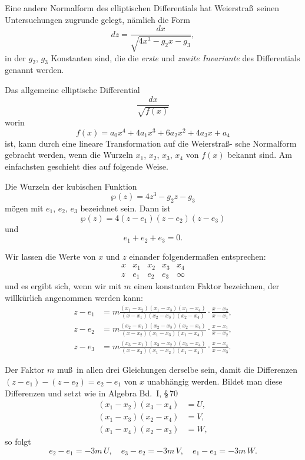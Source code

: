 \documentclass[12pt,a4paper]{book}
\theoremstyle{definition}
\begin{document}
Eine andere Normalform des elliptischen Differentials hat
Weierstra\ss\ seinen Untersuchungen zugrunde gelegt, n\"amlich
die Form
\begin{equation}
dz = \frac{dx}{\sqrt{4x^3 - g_2 x - g_3}}, \tag{1}
\end{equation}
in der $g_2$, $g_3$ Konstanten sind, die die \emph{erste} und \emph{zweite Invariante}
des Differentials genannt werden.

Das allgemeine elliptische Differential
\begin{equation}
\frac{dx}{\sqrt{f(x)}} \tag{2}
\end{equation}
worin
\begin{equation}
f(x) = a_0 x^4 + 4a_1 x^3 + 6a_2 x^2 + 4a_3 x + a_4 \tag{3}
\end{equation}
ist, kann durch eine lineare Transformation auf die Weierstra\ss-
sche Normalform gebracht werden, wenn die Wurzeln
$x_1$, $x_2$, $x_3$, $x_4$ von $f(x)$ bekannt sind. Am einfachsten geschieht
dies auf folgende Weise.

Die Wurzeln der kubischen Funktion
\[
\wp(z) = 4z^3 - g_2 z - g_3
\]
m\"ogen mit $e_1$, $e_2$, $e_3$ bezeichnet sein. Dann ist
\[
\wp(z) = 4(z - e_1)(z - e_2)(z - e_3)
\]
und
\[
e_1 + e_2 + e_3 = 0.
\]

Wir lassen die Werte von $x$ und $z$ einander folgenderma\ss en
entsprechen:
\[
\begin{array}{c|cccc}
x & x_1 & x_2 & x_3 & x_4 \\ \hline
z & e_1 & e_2 & e_3 & \infty
\end{array}
\]
und es ergibt sich, wenn wir mit $m$ einen konstanten Faktor
bezeichnen, der willk\"urlich angenommen werden kann:
\begin{equation}
\begin{aligned}
z - e_1 &= m\frac{(x_1 - x_2)(x_1 - x_3)(x_1 - x_4)}{(x - x_1)(x_2 - x_3)(x_2 - x_4)} \cdot \frac{x - x_2}{x - x_1},\\
z - e_2 &= m\frac{(x_2 - x_1)(x_2 - x_3)(x_2 - x_4)}{(x - x_2)(x_1 - x_3)(x_1 - x_4)} \cdot \frac{x - x_1}{x - x_2},\\
z - e_3 &= m\frac{(x_3 - x_1)(x_3 - x_2)(x_3 - x_4)}{(x - x_3)(x_1 - x_2)(x_1 - x_4)} \cdot \frac{x - x_4}{x - x_3}.
\end{aligned}
\tag{4}
\end{equation}

Der Faktor $m$ mu\ss\ in allen drei Gleichungen derselbe sein,
damit die Differenzen $(z - e_1) - (z - e_2) = e_2 - e_1$ von $x$
unabh\"angig werden. Bildet man diese Differenzen und setzt
wie in Algebra Bd.~I, \S\,70
\[
\begin{aligned}
(x_1 - x_2)(x_3 - x_4) &= U,\\
(x_1 - x_3)(x_2 - x_4) &= V,\\
(x_1 - x_4)(x_2 - x_3) &= W,
\end{aligned}
\]
so folgt
\[
e_2 - e_1 = -3m\,U, \quad e_3 - e_2 = -3m\,V, \quad e_1 - e_3 = -3m\,W.
\]
\end{document}

